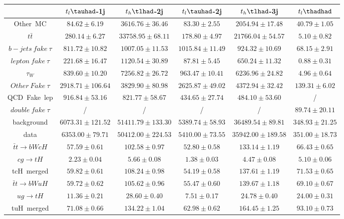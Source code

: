 \centering
\begin{tabular}{|c|c|c|c|c|c|} \hline
 & $t_{l}\tauhad$-1j & $t_{h}\tlhad$-2j & $t_{l}\tauhad$-2j & $t_{h}\tlhad$-3j & $t_{l}\thadhad$\\\hline
Other~MC & $84.62\pm6.19$ & $3616.76\pm36.46$ & $83.30\pm2.55$ & $2054.94\pm17.48$ & $40.79\pm1.05$\\\hline
$t\bar{t}$ & $280.14\pm6.27$ & $33758.95\pm68.11$ & $178.80\pm4.97$ & $21766.04\pm54.57$ & $5.10\pm0.82$\\\hline
$b-jets~fake~\tau$ & $811.72\pm10.82$ & $1007.05\pm11.53$ & $1015.84\pm11.49$ & $924.32\pm10.69$ & $68.15\pm2.91$\\\hline
$lepton~fake~\tau$ & $221.68\pm16.47$ & $1120.54\pm30.89$ & $87.81\pm5.45$ & $650.24\pm11.32$ & $0.88\pm0.31$\\\hline
$\tau_{W}$ & $839.60\pm10.20$ & $7256.82\pm26.72$ & $963.47\pm10.41$ & $6236.96\pm24.82$ & $4.96\pm0.64$\\\hline
$Other~Fake~\tau$ & $2918.71\pm106.64$ & $3829.90\pm80.98$ & $2625.87\pm49.02$ & $4372.94\pm32.42$ & $139.31\pm6.02$\\\hline
QCD~Fake~lep & $916.84\pm53.16$ & $821.77\pm58.67$ & $434.65\pm27.74$ & $484.10\pm53.60$ &  /\\\hline
$double~fake~\tau$ &  / &  / &  / &  / & $89.74\pm20.11$\\\hline
background & $6073.31\pm121.52$ & $51411.79\pm133.30$ & $5389.74\pm58.93$ & $36489.54\pm89.81$ & $348.93\pm21.25$\\\hline
data & $6353.00\pm79.71$ & $50412.00\pm224.53$ & $5410.00\pm73.55$ & $35942.00\pm189.58$ & $351.00\pm18.73$\\\hline
$\bar{t}t\to bWcH$ & $57.59\pm0.61$ & $102.58\pm0.97$ & $52.80\pm0.58$ & $133.14\pm1.19$ & $66.43\pm0.65$\\\hline
$cg\to tH$ & $2.23\pm0.04$ & $5.66\pm0.08$ & $1.38\pm0.03$ & $4.47\pm0.08$ & $5.10\pm0.06$\\\hline
tcH~merged & $59.82\pm0.61$ & $108.24\pm0.98$ & $54.19\pm0.58$ & $137.61\pm1.19$ & $71.53\pm0.65$\\\hline
$\bar{t}t\to bWuH$ & $59.72\pm0.62$ & $105.62\pm0.96$ & $55.47\pm0.60$ & $139.67\pm1.18$ & $69.10\pm0.67$\\\hline
$ug\to tH$ & $11.36\pm0.21$ & $28.60\pm0.40$ & $7.51\pm0.17$ & $24.78\pm0.40$ & $24.00\pm0.31$\\\hline
tuH~merged & $71.08\pm0.66$ & $134.22\pm1.04$ & $62.98\pm0.62$ & $164.45\pm1.25$ & $93.10\pm0.73$\\\hline
\end{tabular}
